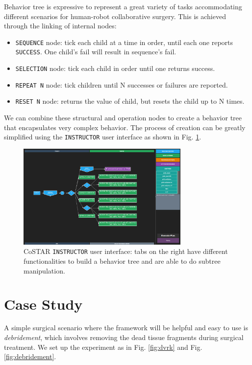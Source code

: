 \documentclass[letterpaper, 10 pt, conference]{ieeeconf}
\begin{document}
Behavior tree is expressive to represent a great variety of tasks accommodating different scenarios for human-robot collaborative surgery. This is achieved through the linking of internal nodes:
 
\begin{itemize}
\item \texttt{SEQUENCE} node: tick each child at a time in order, until each one reports \texttt{SUCCESS}. One child's fail will result in sequence's fail.
\item \texttt{SELECTION} node: tick each child in order until one returns success.
\item \texttt{REPEAT N} node: tick children until N successes or failures are reported.
\item \texttt{RESET N} node: returns the value of child, but resets the child up to N times.
\end{itemize} 

We can combine these structural and operation nodes to create a behavior tree that encapsulates very complex behavior. The process of creation can be greatly simplified using the \texttt{INSTRUCTOR} user interface as shown in Fig. \ref{fig:instructor}.

\begin{figure}[bt]
\centering
\includegraphics[width=240pt]{instructor.png}
\caption{CoSTAR \texttt{INSTRUCTOR} user interface: tabs on the right have different functionalities to build a behavior tree and are able to do subtree manipulation. }
\label{fig:instructor}
\end{figure}


\section{Case Study}
A simple surgical scenario where the framework will be helpful and easy to use is \textit{debridement}, which involves removing the dead tissue fragments during surgical treatment. We set up the experiment as in Fig. \ref{fig:dvrk} and Fig. \ref{fig:debridement}. 
\end{document}
